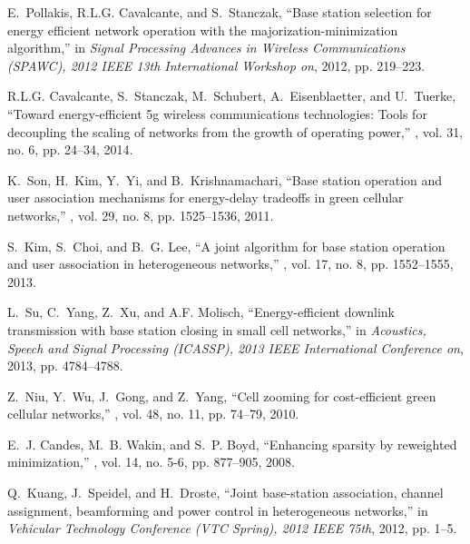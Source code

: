 \documentclass{article}
\begin{document}
\begin{thebibliography}{10}

E.~Pollakis, R.L.G. Cavalcante, and S.~Stanczak,
\newblock ``Base station selection for energy efficient network operation with
  the majorization-minimization algorithm,''
\newblock in {\em Signal Processing Advances in Wireless Communications
  (SPAWC), 2012 IEEE 13th International Workshop on}, 2012, pp. 219--223.

R.L.G. Cavalcante, S.~Stanczak, M.~Schubert, A.~Eisenblaetter, and U.~Tuerke,
\newblock ``Toward energy-efficient 5g wireless communications technologies:
  Tools for decoupling the scaling of networks from the growth of operating
  power,''
, vol. 31, no. 6, pp. 24--34, 2014.

K.~Son, H.~Kim, Y.~Yi, and B.~Krishnamachari,
\newblock ``Base station operation and user association mechanisms for
  energy-delay tradeoffs in green cellular networks,''
, vol. 29, no. 8, pp. 1525--1536,
  2011.

S.~Kim, S.~Choi, and B.~G. Lee,
\newblock ``A joint algorithm for base station operation and user association
  in heterogeneous networks,''
, vol. 17, no. 8, pp. 1552--1555, 2013.

L.~Su, C.~Yang, Z.~Xu, and A.F. Molisch,
\newblock ``Energy-efficient downlink transmission with base station closing in
  small cell networks,''
\newblock in {\em Acoustics, Speech and Signal Processing (ICASSP), 2013 IEEE
  International Conference on}, 2013, pp. 4784--4788.

Z.~Niu, Y.~Wu, J.~Gong, and Z.~Yang,
\newblock ``Cell zooming for cost-efficient green cellular networks,''
, vol. 48, no. 11, pp. 74--79, 2010.

E.~J. Candes, M.~B. Wakin, and S.~P. Boyd,
\newblock ``Enhancing sparsity by reweighted  minimization,''
, vol. 14, no. 5-6,
  pp. 877--905, 2008.

Q.~Kuang, J.~Speidel, and H.~Droste,
\newblock ``Joint base-station association, channel assignment, beamforming and
  power control in heterogeneous networks,''
\newblock in {\em Vehicular Technology Conference (VTC Spring), 2012 IEEE
  75th}, 2012, pp. 1--5.


\end{thebibliography}
\end{document}
